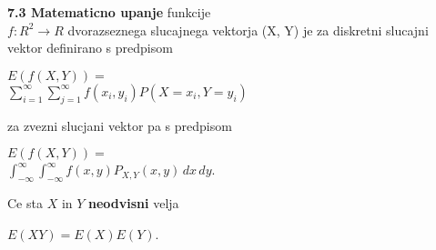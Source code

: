 \documentclass{article}
\begin{document}
\begin{multicols}{3}
\textbf{7.3 Matematicno upanje} funkcije\\
$f: R^2 \rightarrow R$ dvorazseznega slucajnega vektorja (X, Y) je 
za diskretni slucajni vektor definirano s predpisom
\begin{center}
    \begin{math}
        E(f(X,Y)) = 
    \end{math}\\
    \begin{math}
        \sum_{i=1}^{\infty}\sum_{j=1}^{\infty} f(x_i, y_i) P(X = x_i, Y = y_i)
    \end{math}
\end{center}
za zvezni slucjani vektor pa s predpisom
\begin{center}
    \begin{math}
        E(f(X,Y)) = 
    \end{math}\\
    \begin{math}
        \int_{-\infty}^{\infty}\int_{-\infty}^{\infty} f(x, y) P_{X,Y}(x,y)\,dx\,dy
    \end{math}.
\end{center}
Ce sta $X$ in $Y$ \textbf{neodvisni} velja
\begin{center}
    \begin{math}
        E(XY) = E(X)E(Y)
    \end{math}.
\end{center}


\end{multicols}
\end{document}
